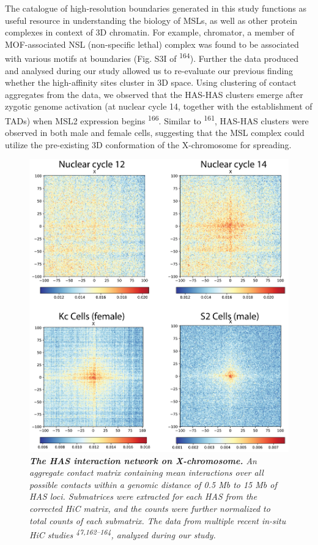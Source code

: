\documentclass[11pt,twoside]{MPIthesis}
\theoremstyle{definition}
\theoremstyle{definition}
\theoremstyle{definition}
\theoremstyle{remark}
\begin{document}
The catalogue of high-resolution boundaries generated in this study
functions as useful resource in understanding the biology of MSLs, as
well as other protein complexes in context of 3D chromatin. For example,
chromator, a member of MOF-associated NSL (non-specific lethal) complex
was found to be associated with various motifs at boundaries (Fig. S3I
of \textsuperscript{164}). Further the data produced and analysed during
our study allowed us to re-evaluate our previous finding whether the
high-affinity sites cluster in 3D space. Using clustering of contact
aggregates from the data, we observed that the HAS-HAS clusters emerge
after zygotic genome activation (at nuclear cycle 14, together with the
establishment of TADs) when MSL2 expression begins
\textsuperscript{166}. Similar to \textsuperscript{161}, HAS-HAS
clusters were observed in both male and female cells, suggesting that
the MSL complex could utilize the pre-existing 3D conformation of the
X-chromosome for spreading.
\begin{figure}

{\centering \includegraphics[width=0.7\linewidth]{figures/results_fig2} 

}

\caption[The HAS interaction network on X-chromosome]{\emph{\textbf{The HAS interaction network on X-chromosome.}
An aggregate contact matrix containing mean interactions over all
possible contacts within a genomic distance of 0.5 Mb to 15 Mb of HAS
loci. Submatrices were extracted for each HAS from the corrected HiC
matrix, and the counts were further normalized to total counts of each
submatrix. The data from multiple recent in-situ HiC studies
\textsuperscript{47,162--164}, analyzed during our study.}}\label{fig:unnamed-chunk-7}
\end{figure}
\end{document}
